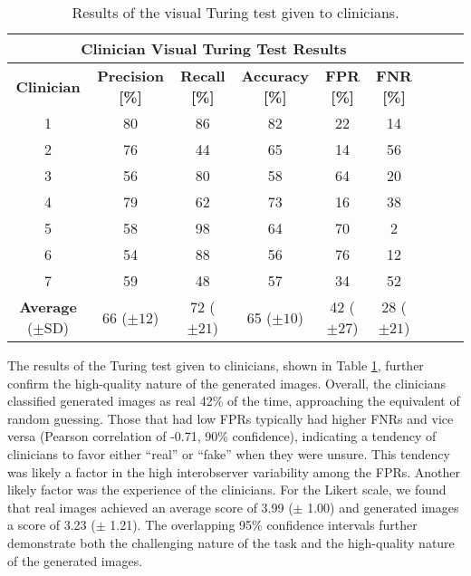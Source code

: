 \documentclass[runningheads]{llncs}
\begin{document}
\begin{table}
    \centering
    \caption{Results of the visual Turing test given to clinicians.}
    \begin{tabular}{|c|c|c|c|c|c|c|c|c|}
        \multicolumn{6}{c}{\textbf{Clinician Visual Turing Test Results}} \\
        \hline
         \textbf{Clinician}
            & \textbf{Precision [\%]}
            & \textbf{Recall [\%]}
            & \textbf{Accuracy [\%]}
            & \textbf{FPR [\%]}
            & \textbf{FNR [\%]} \\
         \hline
        1 & 80 & 86 & 82 & 22 & 14\\
        \hline
        2 & 76 & 44 & 65 & 14 & 56 \\
        \hline
        3 & 56 & 80 & 58 & 64 & 20 \\
        \hline
        4 & 79 & 62 & 73 & 16 & 38 \\
        \hline
        5 & 58 & 98 & 64 & 70 & 2 \\
        \hline
        6 & 54 & 88 & 56 & 76 & 12 \\
        \hline
        7 & 59 & 48 & 57 & 34 & 52 \\
        \hline
        \textbf{Average} ($\pm$SD)
            & 66 ($\pm 12$)
            & 72 ($\pm 21$)
            & 65 ($\pm 10$)
            & 42 ($\pm 27$)
            & 28 ($\pm 21$)\\
        \hline
    \end{tabular}
    \label{tab:vtt}
\end{table}

The results of the Turing test given to clinicians, shown in Table \ref{tab:vtt}, further confirm the high-quality nature of the generated images.
Overall, the clinicians classified generated images as real 42\% of the time, approaching the equivalent of random guessing.
Those that had low FPRs typically had higher FNRs and vice versa (Pearson correlation of -0.71, 90\% confidence), indicating a tendency of clinicians to favor either ``real'' or ``fake'' when they were unsure.
This tendency was likely a factor in the high interobserver variability among the FPRs.
Another likely factor was the experience of the clinicians.
For the Likert scale, we found that real images achieved an average score of 3.99 ($\pm$ 1.00) and generated images a score of 3.23 ($\pm$ 1.21).
The overlapping 95\% confidence intervals further demonstrate both the challenging nature of the task and the high-quality nature of the generated images.
\end{document}
